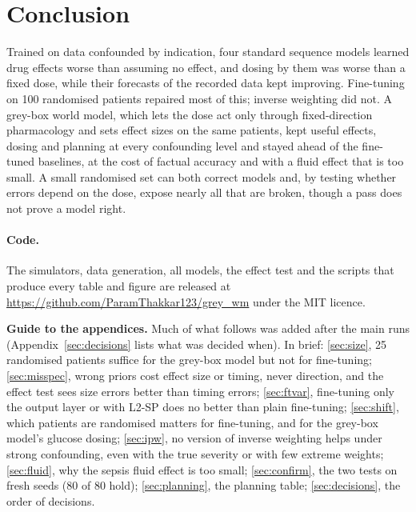 \documentclass[letterpaper]{article}
\begin{document}
\section{Conclusion}

Trained on data confounded by indication, four standard sequence models learned drug effects worse than assuming no effect, and dosing by them was worse than a fixed dose, while their forecasts of the recorded data kept improving. Fine-tuning on 100 randomised patients repaired most of this; inverse weighting did not. A grey-box world model, which lets the dose act only through fixed-direction pharmacology and sets effect sizes on the same patients, kept useful effects, dosing and planning at every confounding level and stayed ahead of the fine-tuned baselines, at the cost of factual accuracy and with a fluid effect that is too small. A small randomised set can both correct models and, by testing whether errors depend on the dose, expose nearly all that are broken, though a pass does not prove a model right.

\paragraph{Code.} The simulators, data generation, all models, the effect test and the scripts that produce every table and figure are released at \url{https://github.com/ParamThakkar123/grey_wm} under the MIT licence.

\ifaaaikit

\else
\ifaaaikit\else\fi

\fi

\clearpage
\appendix
\noindent\textbf{Guide to the appendices.} Much of what follows was added after the main runs (Appendix~\ref{sec:decisions} lists what was decided when). In brief: \ref{sec:size}, 25 randomised patients suffice for the grey-box model but not for fine-tuning; \ref{sec:misspec}, wrong priors cost effect size or timing, never direction, and the effect test sees size errors better than timing errors; \ref{sec:ftvar}, fine-tuning only the output layer or with L2-SP does no better than plain fine-tuning; \ref{sec:shift}, which patients are randomised matters for fine-tuning, and for the grey-box model's glucose dosing; \ref{sec:ipw}, no version of inverse weighting helps under strong confounding, even with the true severity or with few extreme weights; \ref{sec:fluid}, why the sepsis fluid effect is too small; \ref{sec:confirm}, the two tests on fresh seeds (80 of 80 hold); \ref{sec:planning}, the planning table; \ref{sec:decisions}, the order of decisions.
\end{document}
